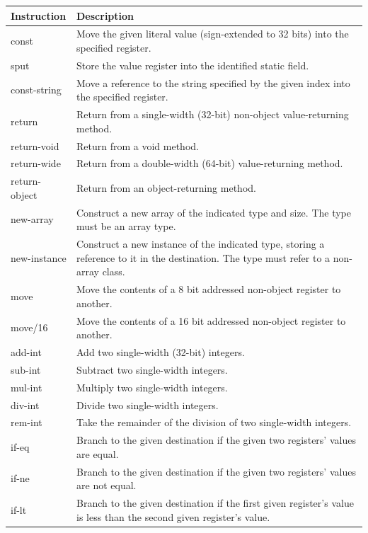 \documentclass[parskip]{cs4rep}
\begin{document}
\begin{table}[htb]
    \centering
    \begin{tabular}{ | l | p{11.6cm} |}
    \hline
    Instruction & Description \\ \hline
    const & Move the given literal value (sign-extended to 32 bits) into the specified register. \\ \hline
    sput & Store the value register into the identified static field. \\ \hline
    const-string & Move a reference to the string specified by the given index into the specified register. \\ \hline
    return & Return from a single-width (32-bit) non-object value-returning method. \\ \hline
    return-void & Return from a void method. \\ \hline
    return-wide & Return from a double-width (64-bit) value-returning method. \\ \hline
    return-object & Return from an object-returning method. \\ \hline
    new-array & Construct a new array of the indicated type and size. The type must be an array type. \\ \hline
    new-instance & Construct a new instance of the indicated type, storing a reference to it in the destination. The type must refer to a non-array class. \\ \hline
    move & Move the contents of a 8 bit addressed non-object register to another. \\ \hline
    move/16 & Move the contents of a 16 bit addressed non-object register to another. \\ \hline
    add-int & Add two single-width (32-bit) integers. \\ \hline
    sub-int & Subtract two single-width integers. \\ \hline
    mul-int & Multiply two single-width integers. \\ \hline
    div-int & Divide two single-width integers. \\ \hline
    rem-int & Take the remainder of the division of two single-width integers. \\ \hline
    if-eq & Branch to the given destination if the given two registers' values are equal. \\ \hline
    if-ne & Branch to the given destination if the given two registers' values are not equal. \\ \hline
    if-lt & Branch to the given destination if the first given register's value is less than the second given register's value. \\ \hline

\end{tabular}
\end{table}
\end{document}
